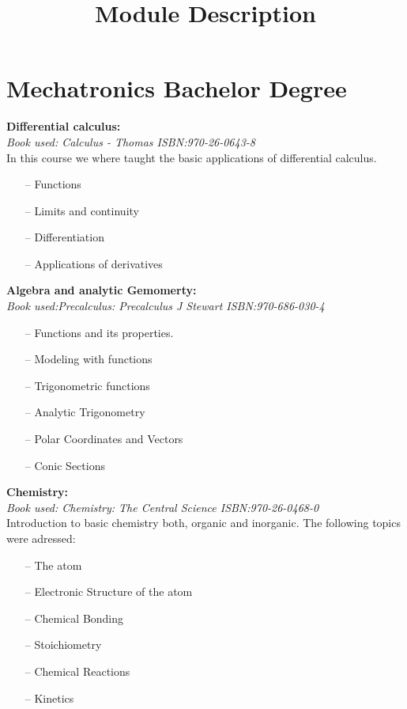 \documentclass{article}
\begin{document}

\title{Module Description}
\maketitle

\section{Mechatronics Bachelor Degree}
\textbf{Differential calculus:}\\
    \emph{Book used: Calculus - Thomas ISBN:970-26-0643-8}\\
    In this course we where taught the basic applications of differential
    calculus.
    \begin{itemize}
     \setlength\itemsep{0pt}
        \item[--] Functions
        \item[--] Limits and continuity
        \item[--] Differentiation
        \item[--] Applications of derivatives
    \end{itemize}


\setlength{\parindent}{0pt}
\textbf{Algebra and analytic Gemomerty:}\\
    \emph{Book used:Precalculus: Precalculus J Stewart ISBN:970-686-030-4}
    \begin{itemize}
     \setlength\itemsep{0pt}
        \item[--] Functions and its properties.
        \item[--] Modeling with functions
        \item[--] Trigonometric functions
        \item[--] Analytic Trigonometry
        \item[--] Polar Coordinates and Vectors
        \item[--] Conic Sections
    \end{itemize}

\textbf{Chemistry:}\\
    \emph{Book used: Chemistry: The Central Science ISBN:970-26-0468-0}\\
    Introduction to basic chemistry both, organic and inorganic.
    The following topics were adressed:
    \begin{itemize}
     \setlength\itemsep{0pt}
    \item[--] The atom
    \item[--] Electronic Structure of the atom
    \item[--] Chemical Bonding
    \item[--] Stoichiometry
    \item[--] Chemical Reactions
    \item[--] Kinetics
    \end{itemize}
\end{document}
